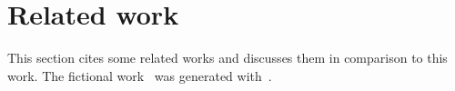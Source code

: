 \section{Related work}
\label{sec:related-work}

This section cites some related works and discusses them in comparison to this
work. The fictional work~\cite{bar-1490} was generated with~\cite{kokkonis-2024}.
